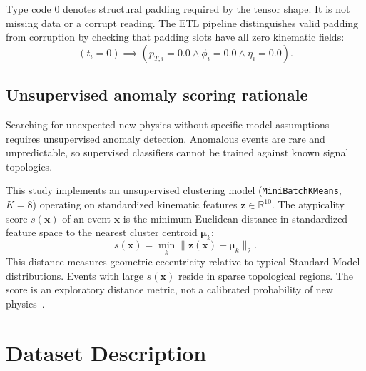 \documentclass[11pt,a4paper]{article}
\begin{document}
Type code $0$ denotes structural padding required by the tensor shape. It is not missing data or a corrupt reading. The ETL pipeline distinguishes valid padding from corruption by checking that padding slots have all zero kinematic fields:
\begin{equation}
    (t_i = 0) \implies (p_{T,i} = 0.0 \land \phi_i = 0.0 \land \eta_i = 0.0).
\end{equation}

\subsection{Unsupervised anomaly scoring rationale}

Searching for unexpected new physics without specific model assumptions requires unsupervised anomaly detection. Anomalous events are rare and unpredictable, so supervised classifiers cannot be trained against known signal topologies.

This study implements an unsupervised clustering model (\texttt{MiniBatchKMeans}, $K=8$) operating on standardized kinematic features $\mathbf{z} \in \mathbb{R}^{10}$. The atypicality score $s(\mathbf{x})$ of an event $\mathbf{x}$ is the minimum Euclidean distance in standardized feature space to the nearest cluster centroid $\boldsymbol{\mu}_k$:
\begin{equation}
    s(\mathbf{x}) = \min_{k} \|\mathbf{z}(\mathbf{x}) - \boldsymbol{\mu}_k\|_2.
\end{equation}
This distance measures geometric eccentricity relative to typical Standard Model distributions. Events with large $s(\mathbf{x})$ reside in sparse topological regions. The score is an exploratory distance metric, not a calibrated probability of new physics~\cite{adc2021}.

\section{Dataset Description}
\end{document}
